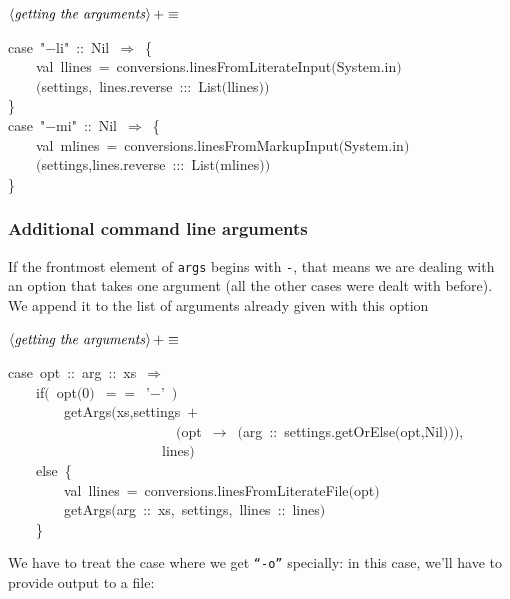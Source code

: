 \documentclass[a4paper,12pt]{article}
\begin{document}
$\left<\mbox{\emph{getting the arguments}}\right>+\equiv$
\begin{program}{\vem case}~"$-$li"~{\rm :}{\rm :}~Nil~$\Rightarrow$~{\small\{}
\\~~~~{\vem val}~llines~=~conversions.linesFromLiterateInput$($System.in$)$
\\~~~~$($settings,~lines.reverse~{\rm :}{\rm :}{\rm :}~List$($llines$)$$)$
\\{\small\}}
\\{\vem case}~"$-$mi"~{\rm :}{\rm :}~Nil~$\Rightarrow$~{\small\{}
\\~~~~{\vem val}~mlines~=~conversions.linesFromMarkupInput$($System.in$)$
\\~~~~$($settings,lines.reverse~{\rm :}{\rm :}{\rm :}~List$($mlines$)$$)$
\\{\small\}}
\\[0.5em]\end{program}
\subsubsection{Additional command line arguments}
If the frontmost element of \texttt{args} begins with \texttt{-}, that means we
are dealing with an option that takes one argument (all the other cases
were dealt with before). We append it to the list of arguments already
given with this option

$\left<\mbox{\emph{getting the arguments}}\right>+\equiv$
\begin{program}{\vem case}~opt~{\rm :}{\rm :}~arg~{\rm :}{\rm :}~xs~$\Rightarrow$
\\~~~~{\vem if}$($~opt$($0$)$~$==$~'$-$'~$)$
\\~~~~~~~~getArgs$($xs,settings~$+$
\\~~~~~~~~~~~~~~~~~~~~~~~~$($opt~$\rightarrow$~$($arg~{\rm :}{\rm :}~settings.getOrElse$($opt,Nil$)$$)$$)$,
\\~~~~~~~~~~~~~~~~~~~~~~lines$)$
\\~~~~{\vem else}~{\small\{}
\\~~~~~~~~{\vem val}~llines~=~conversions.linesFromLiterateFile$($opt$)$
\\~~~~~~~~getArgs$($arg~{\rm :}{\rm :}~xs,~settings,~llines~{\rm :}{\rm :}~lines$)$
\\~~~~{\small\}}
\\[0.5em]\end{program}
We have to treat the case where we get \texttt{``-o''} specially:
in this case, we'll have to provide output to a file:
\end{document}
